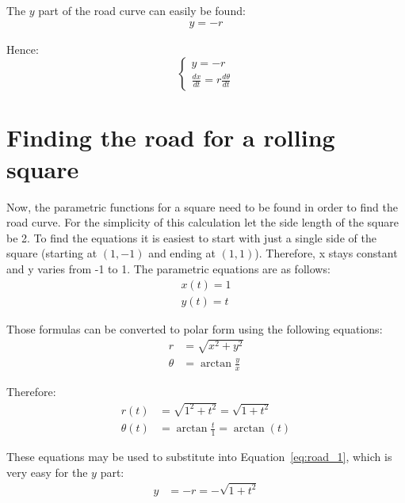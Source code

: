 \documentclass[12pt]{article}
\begin{document}
        The $y$ part of the road curve can easily be found:
        \begin{align}
            y = -r
        \end{align}

        Hence:
        \begin{equation}\label{eq:road_1}
            \begin{cases}
                y = -r \\
                \frac{dx}{dt} = r \frac{d\theta}{dt}
            \end{cases}
        \end{equation}

    \section{Finding the road for a rolling square}

        Now, the parametric functions for a square need to be found in order to find the road curve. For the simplicity of this calculation let the side length of the square be 2. To find the equations it is easiest to start with just a single side of the square (starting at $(1, -1)$ and ending at $(1, 1)$). Therefore, x stays constant and y varies from -1 to 1. The parametric equations are as follows:
        \begin{align}
            x(t) = 1 \\
            y(t) = t
        \end{align}

        Those formulas can be converted to polar form using the following equations\cite{polar_rectangular}:
        \begin{align}
            r &= \sqrt{x^2 + y^2} \\
            \theta &= \arctan\frac{y}{x}
        \end{align}

        Therefore:
        \begin{align}
            r(t) &= \sqrt{1^2 + t^2} = \sqrt{1+t^2} \\
            \theta(t) &= \arctan\frac{t}{1} = \arctan(t)
        \end{align}

        These equations may be used to substitute into Equation~\ref{eq:road_1}, which is very easy for the $y$ part:
        \begin{align}
            y &= -r = -\sqrt{1+t^2}
        \end{align}
\end{document}
